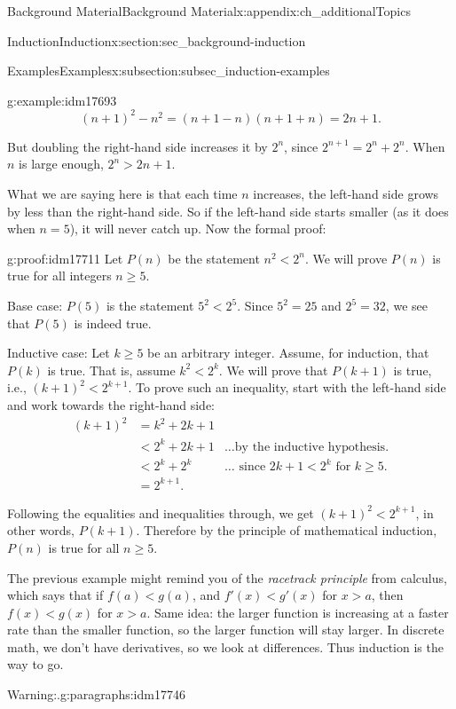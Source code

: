 \documentclass[oneside,10pt,]{book}
\numberwithin{equation}{chapter}
\newcommand{\lt}{<}
\newcommand{\amp}{&}
\begin{document}
\begin{appendixptx}{Background Material}{}{Background Material}{}{}{x:appendix:ch_additionalTopics}
\begin{sectionptx}{Induction}{}{Induction}{}{}{x:section:sec_background-induction}
\begin{subsectionptx}{Examples}{}{Examples}{}{}{x:subsection:subsec_induction-examples}
\begin{example}{}{g:example:idm17693}
\begin{equation*}
(n+1)^2 - n^2 = (n+1-n)(n+1+n) = 2n+1.
\end{equation*}
%
\par
But doubling the right-hand side increases it by \(2^n\), since \(2^{n+1} = 2^n + 2^n\). When \(n\) is large enough, \(2^n > 2n + 1\).%
\par
What we are saying here is that each time \(n\) increases, the left-hand side grows by less than the right-hand side. So if the left-hand side starts smaller (as it does when \(n = 5\)), it will never catch up. Now the formal proof:%
\begin{proofptx}{}{g:proof:idm17711}
Let \(P(n)\) be the statement \(n^2 \lt  2^n\). We will prove \(P(n)\) is true for all integers \(n \ge 5\).%
\par
Base case: \(P(5)\) is the statement \(5^2 \lt  2^5\). Since \(5^2 = 25\) and \(2^5 = 32\), we see that \(P(5)\) is indeed true.%
\par
Inductive case: Let \(k \ge 5\) be an arbitrary integer. Assume, for induction, that \(P(k)\) is true. That is, assume \(k^2 \lt  2^k\). We will prove that \(P(k+1)\) is true, i.e., \((k+1)^2 \lt  2^{k+1}\). To prove such an inequality, start with the left-hand side and work towards the right-hand side:%
\begin{align*}
(k+1)^2 \amp = k^2 + 2k + 1 \amp\\
\amp \lt 2^k + 2k + 1 \amp \ldots\text{by the inductive hypothesis.}\\
\amp \lt 2^k + 2^k \amp \ldots\text{ since } 2k + 1 \lt  2^k \text{ for }k \ge 5.\\
\amp = 2^{k+1}. \amp
\end{align*}
%
\par
Following the equalities and inequalities through, we get \((k+1)^2 \lt  2^{k+1}\), in other words, \(P(k+1)\). Therefore by the principle of mathematical induction, \(P(n)\) is true for all \(n \ge 5\).%
\end{proofptx}
\end{example}
The previous example might remind you of the \emph{racetrack principle} from calculus, which says that if \(f(a) \lt  g(a)\), and \(f'(x) \lt  g'(x)\) for \(x > a\), then \(f(x) \lt  g(x)\) for \(x > a\). Same idea: the larger function is increasing at a faster rate than the smaller function, so the larger function will stay larger. In discrete math, we don't have derivatives, so we look at differences. Thus induction is the way to go.%
\begin{paragraphs}{Warning:.}{g:paragraphs:idm17746}%

\end{paragraphs}
\end{subsectionptx}
\end{sectionptx}
\end{appendixptx}
\end{document}
